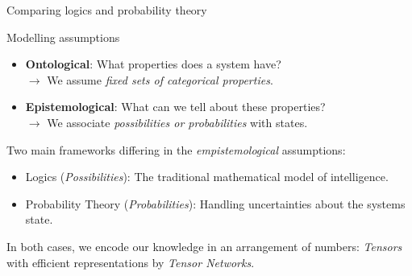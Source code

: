 \documentclass{beamer}
\begin{document}
    \begin{frame}{Comparing logics and probability theory}

        \begin{block}{Modelling assumptions}
            \begin{itemize}
                \item \textbf{Ontological}: What properties does a system have? \\
                \hspace{0.5cm} $\rightarrow$ We assume \emph{fixed sets of categorical properties}.
                \item \textbf{Epistemological}: What can we tell about these properties? \\
                \hspace{0.5cm} $\rightarrow$ We associate \emph{possibilities or probabilities} with states.
            \end{itemize}
        \end{block}

        Two main frameworks differing in the \emph{empistemological} assumptions:
        \begin{itemize}
            \item Logics (\emph{Possibilities}): The traditional mathematical model of intelligence.
            \item Probability Theory (\emph{Probabilities}): Handling uncertainties about the systems state.
        \end{itemize}
        In both cases, we encode our knowledge in an arrangement of numbers:
        \emph{Tensors} with efficient representations by \emph{Tensor Networks}.

    \end{frame}
\end{document}
